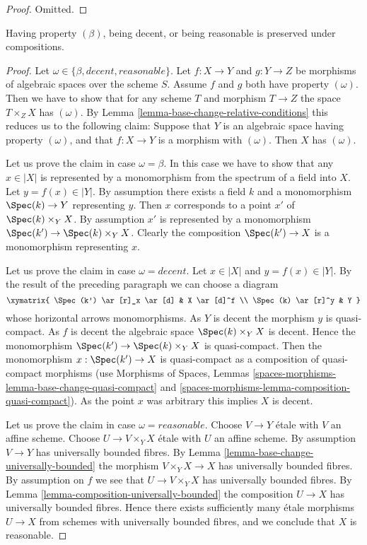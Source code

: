 \begin{proof}
Omitted.
\end{proof}

\begin{lemma}
\label{lemma-composition-relative-conditions}
Having property $(\beta)$, being decent, or being reasonable
is preserved under compositions.
\end{lemma}

\begin{proof}
Let $\omega \in \{\beta, decent, reasonable\}$.
Let $f : X \to Y$ and $g : Y \to Z$ be morphisms of algebraic spaces
over the scheme $S$. Assume $f$ and $g$ both have property
$(\omega)$. Then we have to show
that for any scheme $T$ and morphism $T \to Z$ the space $T \times_Z X$
has $(\omega)$. By
Lemma \ref{lemma-base-change-relative-conditions}
this reduces us to the following claim: Suppose that $Y$ is an algebraic
space having property $(\omega)$, and that $f : X \to Y$ is a morphism
with $(\omega)$. Then $X$ has $(\omega)$.

\medskip\noindent
Let us prove the claim in case $\omega = \beta$. In this case we have to show
that any $x \in |X|$ is represented by a monomorphism from the spectrum
of a field into $X$. Let $y = f(x) \in |Y|$. By assumption there exists
a field $k$ and a monomorphism $\Spec(k) \to Y$ representing $y$.
Then $x$ corresponds to a point $x'$ of $\Spec(k) \times_Y X$.
By assumption $x'$ is represented by a monomorphism
$\Spec(k') \to \Spec(k) \times_Y X$. Clearly the composition
$\Spec(k') \to X$ is a monomorphism representing $x$.

\medskip\noindent
Let us prove the claim in case $\omega = decent$.
Let $x \in |X|$ and $y = f(x) \in |Y|$. By the result of the preceding
paragraph we can choose a diagram
$$
\xymatrix{
\Spec(k') \ar[r]_x \ar[d] & X \ar[d]^f \\
\Spec(k) \ar[r]^y & Y
}
$$
whose horizontal arrows monomorphisms. As $Y$ is decent the morphism
$y$ is quasi-compact. As $f$ is decent the algebraic space
$\Spec(k) \times_Y X$ is decent. Hence the monomorphism
$\Spec(k') \to \Spec(k) \times_Y X$ is quasi-compact.
Then the monomorphism $x : \Spec(k') \to X$ is quasi-compact
as a composition of quasi-compact morphisms (use
Morphisms of Spaces, Lemmas
\ref{spaces-morphisms-lemma-base-change-quasi-compact} and
\ref{spaces-morphisms-lemma-composition-quasi-compact}).
As the point $x$ was arbitrary this implies $X$ is decent.

\medskip\noindent
Let us prove the claim in case $\omega = reasonable$.
Choose $V \to Y$ \'etale with $V$ an affine scheme.
Choose $U \to V \times_Y X$ \'etale with $U$ an affine scheme.
By assumption $V \to Y$ has universally bounded fibres. By
Lemma \ref{lemma-base-change-universally-bounded}
the morphism $V \times_Y X \to X$ has universally bounded fibres.
By assumption on $f$ we see that $U \to V \times_Y X$ has
universally bounded fibres. By
Lemma \ref{lemma-composition-universally-bounded}
the composition $U \to X$ has universally bounded fibres.
Hence there exists sufficiently many \'etale morphisms $U \to X$
from schemes with universally bounded fibres, and we conclude
that $X$ is reasonable.
\end{proof}

